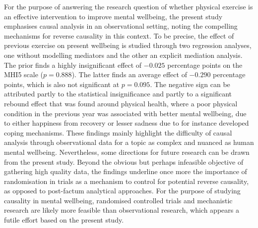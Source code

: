 For the purpose of answering the research question of whether physical exercise is an effective intervention
to improve mental wellbeing, the present study emphasises causal analysis in an observational setting, noting
the compelling mechanisms for reverse causality in this context.
To be precise, the effect of previous exercise on present wellbeing is studied through two regression analyses,
one without modelling mediators and the other an explicit mediation analysis.
The prior finds a highly insignificant effect of $-0.025$ percentage points on the MHI5 scale ($p = 0.888$).
The latter finds an average effect of $-0.290$ percentage points, which is also not significant at $p = 0.095$.
The negative sign can be attributed partly to the statistical insignificance and partly to a significant rebound effect
that was found around physical health, where a poor physical condition
in the previous year was associated with better mental wellbeing, due to either happiness from recovery or lesser
sadness due to for instance developed coping mechanisms.
These findings mainly highlight the difficulty of causal analysis through observational data for a topic as complex
and nuanced as human mental wellbeing. Nevertheless, some directions for future research can be drawn from the present study.
Beyond the obvious but perhaps infeasible objective of gathering high quality data,
the findings underline once more the importance of randomisation in trials as a mechanism to control for potential
reverse causality, as opposed to post-factum analytical approaches.
For the purpose of studying causality in mental wellbeing, randomised controlled trials and mechanistic research are
likely more feasible than observational research, which appears a futile effort based on the present study.
